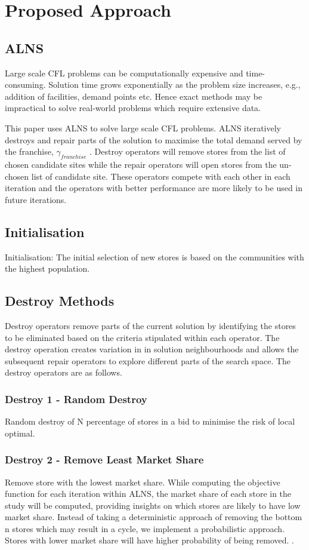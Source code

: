 \documentclass{ecai}
\begin{document}
\section{Proposed Approach}
\subsection{ALNS}
Large scale CFL problems can be computationally expensive and time-consuming. Solution time grows exponentially as the problem size increases, e.g., addition of facilities, demand points etc. Hence exact methods may be impractical to solve real-world problems which require extensive data.

This paper uses ALNS to solve large scale CFL problems. ALNS iteratively destroys and repair parts of the solution to maximise the total demand served by the franchise, $\gamma_{franchise}$ . Destroy operators will remove stores from the list of chosen candidate sites while the repair operators will open stores from the un-chosen list of candidate site. These operators compete with each other in each iteration and the operators with better performance are more likely to be used in future iterations.  

\subsection{Initialisation}
Initialisation: The initial selection of new stores is based on the communities with the highest population.

\subsection{Destroy Methods}
Destroy operators remove parts of the current solution by identifying the stores to be eliminated based on the criteria stipulated within each operator. The destroy operation creates  variation in in solution neighbourhoods and allows the subsequent repair operators to explore different parts of the search space. The destroy operators are as follows.

\subsubsection{Destroy 1 - Random Destroy}
Random destroy of N percentage of stores in a bid to minimise the risk of local optimal.

\subsubsection{Destroy 2 - Remove Least Market Share}
Remove store with the lowest market share. While computing the objective function for each iteration within ALNS, the market share of each store in the study will be computed, providing insights on which stores are likely to have low market share. Instead of taking a deterministic approach of removing the bottom n stores which may result in a cycle, we implement a probabilistic approach. Stores with lower market share will have higher probability of being removed. . 
\end{document}
